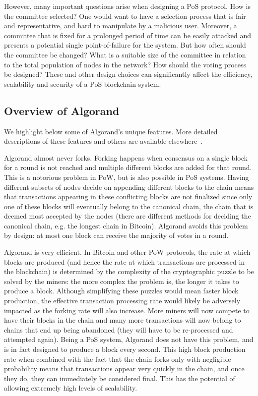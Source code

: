 However, many important questions arise when designing a PoS protocol. How is the committee selected? One would want to have a selection process that is fair and representative, and hard to manipulate by a malicious user. Moreover, a committee that is fixed for a prolonged period of time can be easily attacked and presents a potential single point-of-failure for the system. But how often should the committee be changed? What is a suitable size of the committee in relation to the total population of nodes in the network? How should the voting process be designed? These and other design choices can significantly affect the efficiency, scalability and security of a PoS blockchain system. 

\subsection{Overview of Algorand}

We highlight below some of Algorand's unique features. More detailed descriptions of these features and others are available elsewhere~\cite{Chen2018,Chen2019}.

Algorand almost never forks. Forking happens when consensus on a single block for a round is not reached and multiple different blocks are added for that round. This is a notorious problem in PoW, but is also possible in PoS systems. Having different subsets of nodes decide on appending different blocks to the chain means that transactions appearing in these conflicting blocks are not finalized since only one of these blocks will eventually belong to the canonical chain, the chain that is deemed most accepted by the nodes (there are different methods for deciding the canonical chain, e.g. the longest chain in Bitcoin). Algorand avoids this problem by design: at most one block can receive the majority of votes in a round.

Algorand is very efficient. In Bitcoin and other PoW protocols, the rate at which blocks are produced (and hence the rate at which transactions are processed in the blockchain) is determined by the complexity of the cryptographic puzzle to be solved by the miners: the more complex the problem is, the longer it takes to produce a block. Although simplifying these puzzles would mean faster block production, the effective transaction processing rate would likely be adversely impacted as the forking rate will also increase. More miners will now compete to have their blocks in the chain and many more transactions will now belong to chains that end up being abandoned (they will have to be re-processed and attempted again). Being a PoS system, Algorand does not have this problem, and is in fact designed to produce a block every second. This high block production rate when combined with the fact that the chain forks only with negligible probability means that transactions appear very quickly in the chain, and once they do, they can immediately be considered final. This has the potential of allowing extremely high levels of scalability.

